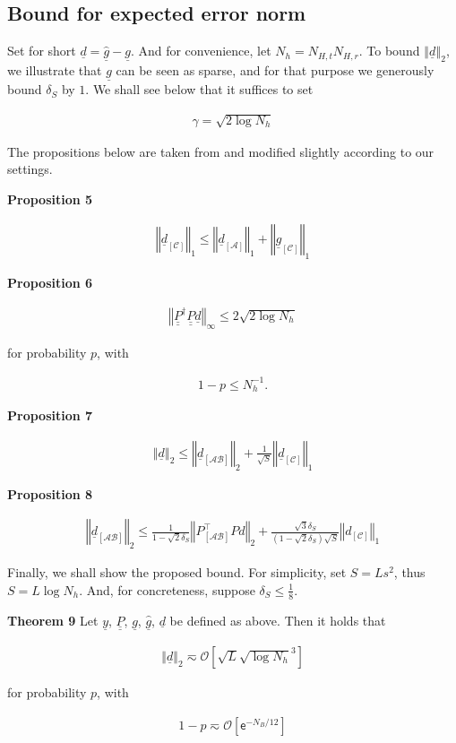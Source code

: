 \documentclass[journal]{IEEEtran}
\newcommand {\g} {\gamma}
\renewcommand {\d} {\delta}
\newcommand {\m} [1] {\( #1 \)}
\newcommand {\V} [1] {\underline {#1}}
\newcommand {\M} [1] {\underline {\underline {#1}}}
\newcommand {\RB} [1] {\left( #1 \right)}
\newcommand {\SB} [1] {\left[ #1 \right]}
\newcommand {\VNm} [1] {\left \Vert #1 \right \Vert}
\newcommand {\R} [1] {\sqrt {#1}}
\newcommand {\Disp} [1] {
   \begin {align*}
      #1
   \end {align*}
}
\begin{document}

\subsection {Bound for expected error norm}

Set for short \m {\V {d} = \hat {\V {g}} - \V {g}}.
And for convenience, let \m {N_h = N_{H,t} N_{H,r}}.
%
To bound \m {\VNm {\V {d}} _2}, we illustrate that \m {\V {g}} can be seen as sparse, and for that purpose we generously bound \m {\d_{S}} by \m {1}.
We shall see below that it suffices to set
\Disp {
\g
= \R {2 \log N_h} 
}

The propositions below are taken from \cite {CaT07} and modified slightly according to our settings.

\textbf {Proposition 5}
\Disp {
\VNm {\V {d} _{\SB{\mathcal {C}}}} _1
\leq \VNm {\V {d} _{\SB{\mathcal {A}}}} _1
+\VNm {\V {g} _{\SB{\mathcal {C}}}} _1 
}

\textbf {Proposition 6}
\Disp {
\VNm {\M {P}^\dagger \M {P} \V {d}} _\infty
\leq 2 \R {2 \log N_h} 
}
for probability \m {p}, with
\Disp {
1 -p
\leq N_h^{-1}.
}

\textbf {Proposition 7}
\Disp {
\VNm {\V {d}} _2
\leq \VNm {\V {d} _{\SB {\mathcal {AB}}}} _2 + \frac {1} {\R {S}} \VNm {\V {d} _{\SB{\mathcal {C}}}} _1 
}

\textbf {Proposition 8}
\Disp {
\VNm {\V {d} _{\SB{\mathcal {AB}}}} _2
\leq \frac {1} {1- \R{2} \d_{S}} \VNm {P _{\SB {\mathcal {AB}}}^\intercal P d} _2
+ \frac {\R{3} \d_{S}} {\RB {1- \R{2} \d_{S}} \R {S}} \VNm {d_{\SB{\mathcal {C}}}} _1 
}

Finally, we shall show the proposed bound.
For simplicity, set \m {S = Ls^2}, thus \m {S =L \log N_h}.
And, for concreteness, suppose \m {\d_S \leq \frac {1} {8}}.

\textbf {Theorem 9}
Let \m {\V {y}}, \m {\M {P}}, \m {\V {g}}, \m {\hat {\V {g}}}, \m {\V {d}} be defined as above.
Then it holds that
\Disp {
\VNm {\V {d}} _2
\eqsim \mathcal {O} \SB {\R {L} \R {\log N_h}^3} 
}
for probability \m {p}, with
\Disp {
1 -p
\eqsim \mathcal {O} \SB {\mathsf {e} ^{-N_B /12}} 
}
\end{document}
